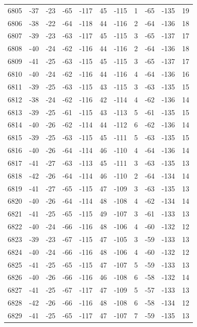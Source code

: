 \begin{table}[H]
\begin{tabular}{lllllllllll}
6805 & -37 & -23 & -65 & -117 & 45 & -115 & 1 & -65 & -135 & 19 \\
6806 & -38 & -22 & -64 & -118 & 44 & -116 & 2 & -64 & -136 & 18 \\
6807 & -39 & -23 & -63 & -117 & 45 & -115 & 3 & -65 & -137 & 17 \\
6808 & -40 & -24 & -62 & -116 & 44 & -116 & 2 & -64 & -136 & 18 \\
6809 & -41 & -25 & -63 & -115 & 45 & -115 & 3 & -65 & -137 & 17 \\
6810 & -40 & -24 & -62 & -116 & 44 & -116 & 4 & -64 & -136 & 16 \\
6811 & -39 & -25 & -63 & -115 & 43 & -115 & 3 & -63 & -135 & 15 \\
6812 & -38 & -24 & -62 & -116 & 42 & -114 & 4 & -62 & -136 & 14 \\
6813 & -39 & -25 & -61 & -115 & 43 & -113 & 5 & -61 & -135 & 15 \\
6814 & -40 & -26 & -62 & -114 & 44 & -112 & 6 & -62 & -136 & 14 \\
6815 & -39 & -25 & -63 & -115 & 45 & -111 & 5 & -63 & -135 & 15 \\
6816 & -40 & -26 & -64 & -114 & 46 & -110 & 4 & -64 & -136 & 14 \\
6817 & -41 & -27 & -63 & -113 & 45 & -111 & 3 & -63 & -135 & 13 \\
6818 & -42 & -26 & -64 & -114 & 46 & -110 & 2 & -64 & -134 & 14 \\
6819 & -41 & -27 & -65 & -115 & 47 & -109 & 3 & -63 & -135 & 13 \\
6820 & -40 & -26 & -64 & -114 & 48 & -108 & 4 & -62 & -134 & 14 \\
6821 & -41 & -25 & -65 & -115 & 49 & -107 & 3 & -61 & -133 & 13 \\
6822 & -40 & -24 & -66 & -116 & 48 & -106 & 4 & -60 & -132 & 12 \\
6823 & -39 & -23 & -67 & -115 & 47 & -105 & 3 & -59 & -133 & 13 \\
6824 & -40 & -24 & -66 & -116 & 48 & -106 & 4 & -60 & -132 & 12 \\
6825 & -41 & -25 & -65 & -115 & 47 & -107 & 5 & -59 & -133 & 13 \\
6826 & -40 & -26 & -66 & -116 & 46 & -108 & 6 & -58 & -132 & 14 \\
6827 & -41 & -25 & -67 & -117 & 47 & -109 & 5 & -57 & -133 & 13 \\
6828 & -42 & -26 & -66 & -116 & 48 & -108 & 6 & -58 & -134 & 12 \\
6829 & -41 & -25 & -65 & -117 & 47 & -107 & 7 & -59 & -135 & 13 \\

\end{tabular}
\end{table}
